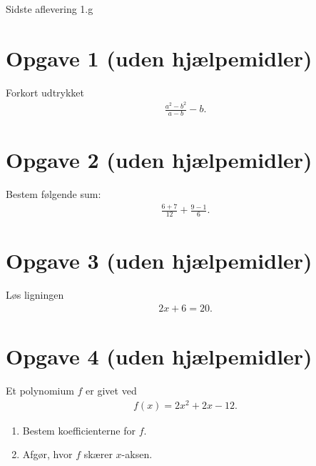 \begin{center}
\Huge
Sidste aflevering 1.g
\end{center}
\section*{Opgave 1 (uden hjælpemidler)}
Forkort udtrykket
\begin{align*}
\frac{a^2-b^2}{a-b} -b.
\end{align*}

\section*{Opgave 2 (uden hjælpemidler)}
Bestem følgende sum:
\begin{align*}
\frac{6+7}{12} + \frac{9-1}{6}.
\end{align*}

\section*{Opgave 3 (uden hjælpemidler)}
Løs ligningen 
\begin{align*}
2x+6=20.
\end{align*}

\section*{Opgave 4 (uden hjælpemidler)}
Et polynomium $f$ er givet ved
\begin{align*}
f(x) = 2x^2+2x-12.
\end{align*} 
\begin{enumerate}[label=\roman*)]
\item Bestem koefficienterne for $f$.
\item Afgør, hvor $f$ skærer $x$-aksen.
\end{enumerate}

